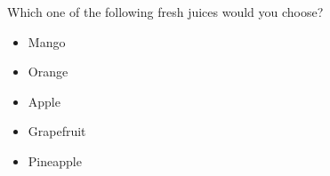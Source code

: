 \begin{tcolorbox}
Which one of the following fresh juices would you choose?

\begin{itemize}
	\item Mango
	\item Orange
	\item Apple
	\item Grapefruit
	\item Pineapple
\end{itemize}
\end{tcolorbox}
